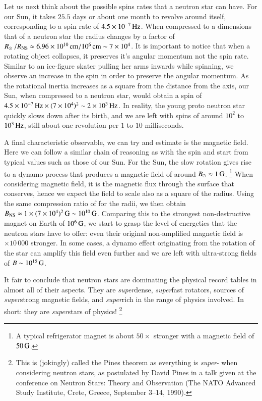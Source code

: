 Let us next think about the possible spins rates that a neutron star can have.
For our Sun, it takes $25.5$ days or about one month to revolve around itself, corresponding to a spin rate of $4.5 \times 10^{-7}\, \mathrm{Hz}$.
When compressed to a dimensions that of a neutron star the radius changes by a factor of $R_{\odot} / R_{\mathrm{NS}} \approx \Ten{6.96}{10}\cm / 10^6 \cm \sim \Ten{7}{4}$.
It is important to notice that when a rotating object collapses, it preserves it's angular momentum not the spin rate.
Similar to an ice-figure skater pulling her arms inwards while spinning, we observe an increase in the spin in order to preserve the angular momentum.
As the rotational inertia increases as a square from the distance from the axis, our Sun, when compressed to a neutron star, would obtain a spin of $4.5 \times 10^{-7}\, \mathrm{Hz} \times (7 \times 10^{4})^2 \sim 2 \times 10^{3} \, \mathrm{Hz}$.
In reality, the young proto neutron star quickly slows down after its birth, and we are left with spins of around $10^2$ to $10^3 \, \mathrm{Hz}$, still about one revolution per $1$ to $10$ milliseconds.




A final characteristic observable, we can try and estimate is the magnetic field.
Here we can follow a similar chain of reasoning as with the spin and start from typical values such as those of our Sun.
For the Sun, the slow rotation gives rise to a dynamo process that produces a magnetic field of around $B_{\odot} \approx 1\, \mathrm{G}$.%
\footnote{A typical refrigerator magnet is about $50\times$ stronger with a magnetic field of $50\, \mathrm{G}$.}
When considering magnetic field, it is the magnetic flux through the surface that conserves, hence we expect the field to scale also as a square of the radius.
Using the same compression ratio of  for the radii, we then obtain $B_{\mathrm{NS}} \approx 1 \times (7 \times 10^{4})^2 \, \mathrm{G} \sim 10^{10} \, \mathrm{G}$.
Comparing this to the strongest non-destructive magnet on Earth of $10^6\, \mathrm{G}$, we start to grasp the level of energetics that the neutron stars have to offer: even their original non-amplified magnetic field is $\times 10\,000$ stronger.
In some cases, a dynamo effect originating from the rotation of the star can amplify this field even further and we are left with ultra-strong fields of $B \sim 10^{15} \, \mathrm{G}$.

It fair to conclude that neutron stars are dominating the physical record tables in almost all of their aspects.
They are \emph{super}dense, \emph{super}fast rotators, sources of \emph{super}strong magnetic fields, and \emph{super}rich in the range of physics involved.
In short: they are \emph{super}stars of physics!%
\footnote{
    This is (jokingly) called the Pines theorem as everything is \emph{super}- when considering neutron stars, as postulated by David Pines in a talk given at the conference on Neutron Stars: Theory and Observation (The NATO Advanced Study Institute, Crete, Greece, September 3–14, 1990).
}



